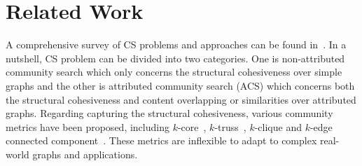 

\section{Related Work}
\label{sec:related}

A comprehensive survey of CS problems and approaches can be found in~\cite{DBLP:journals/vldb/FangHQZZCL20, DBLP:series/synthesis/2019Huang}. 
In a nutshell, CS problem can be divided into two categories. One is non-attributed community search which only concerns the structural cohesiveness over simple graphs and the other is attributed community search (ACS) which concerns both the structural cohesiveness and content overlapping or similarities over attributed graphs.
Regarding capturing the structural cohesiveness, various community metrics have been proposed, including $k$-core~\cite{cs3,cs4,cs6}, $k$-truss~\cite{cs2,cs7}, $k$-clique \cite{cs1,cs8} and $k$-edge connected component~\cite{cs9,cs10}. 
These metrics are inflexible to adapt to complex real-world graphs and applications. 

